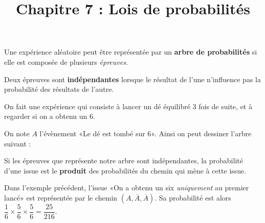 \documentclass[
	classe=$1^{ere}STI2D$
]{coursclass}
\title{Chapitre 7 : Lois de probabilités}
\date{}
\begin{document}
\maketitle

\begin{definition}
	Une expérience aléatoire peut être représentée par un \textbf{arbre de probabilités} si elle est composée de plusieurs \textit{épreuves}.

	Deux épreuves sont \textbf{indépendantes} lorsque le résultat de l'une n'influence pas la probabilité des résultats de l'autre.
\end{definition}

\begin{exemple}
	On fait une expérience qui consiste à lancer un dé équilibré 3 fois de suite, et à regarder si on a obtenu un $6$.

	On note $A$ l'évènement «Le dé est tombé sur $6$». Ainsi on peut dessiner l'arbre suivant :
	\begin{center}
	\end{center}
\end{exemple}

\begin{propriete}
	Si les épreuves que représente notre arbre sont indépendantes, la probabilité d'une issue est le \textbf{produit} des probabilités du chemin qui mène à cette issue.
\end{propriete}

\begin{exemple}
	Dans l'exemple précédent, l'issue «On a obtenu un  six \textit{uniquement} au premier lancé» est représentée par le chemin $(A, \overline{A}, \overline{A})$. Sa probabilité est alors $\dfrac{1}{6} × \dfrac{5}{6} × \dfrac{5}{6} = \dfrac{25}{216}$.
\end{exemple}
\end{document}
